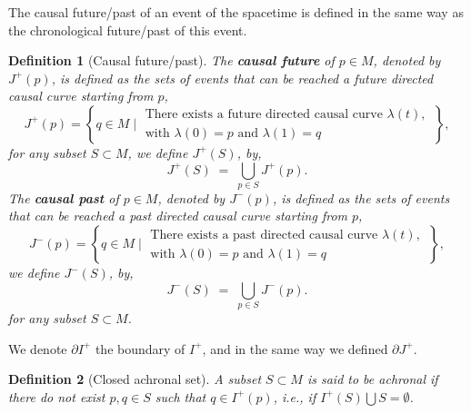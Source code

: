 \documentclass[10pt]{book}
\theoremstyle{break}
\newtheorem{definition}{Definition}
\begin{document}
The causal future/past of an event of the spacetime is defined in the same way as the chronological future/past of this event.

\begin{definition}[Causal future/past] 
The \textbf{causal future} of $p \in M$, denoted by $J^{+}(p)$, is defined as the sets of events that can be reached a future directed causal curve starting from $p$,
\begin{equation*}
J^{+}(p) = \left\{ q \in M \; \bigg| \; \begin{array}{l} \text{There exists a future directed causal curve $\lambda(t)$,} \\ \text{with $\lambda(0)=p$ and $\lambda(1)=q$} \end{array} \; \right\},
\end{equation*}
for any subset $S \subset M$, we define $J^{+}(S)$, by,
\begin{equation*}
J^{+}(S) \; = \; \bigcup_{p \in S} J^{+}(p). 
\end{equation*}
The \textbf{causal past} of $p \in M$, denoted by $J^{-}(p)$, is defined as the sets of events that can be reached a past directed causal curve starting from $p$,
\begin{equation*}
J^{-}(p) = \left\{ q \in M \; \bigg| \; \begin{array}{l} \text{There exists a past directed causal curve $\lambda(t)$,} \\ \text{with $\lambda(0)=p$ and $\lambda(1)=q$} \end{array} \; \right\},
\end{equation*}
we define $J^{-}(S)$, by,
\begin{equation*}
J^{-}(S) \; = \; \bigcup_{p \in S} J^{-}(p). 
\end{equation*}
for any subset $S \subset M$. 
\end{definition}

We denote $\partial I^{+}$ the boundary of $I^+$, and in the same way we defined $\partial J^+$.

\begin{definition}[Closed achronal set]
A subset $S \subset M$ is said to be achronal if there do not exist $p, q \in S$ such that $q \in I^{+}(p)$, i.e., if $I^{+}(S) \bigcup S = \emptyset$. 
\end{definition}
\end{document}
